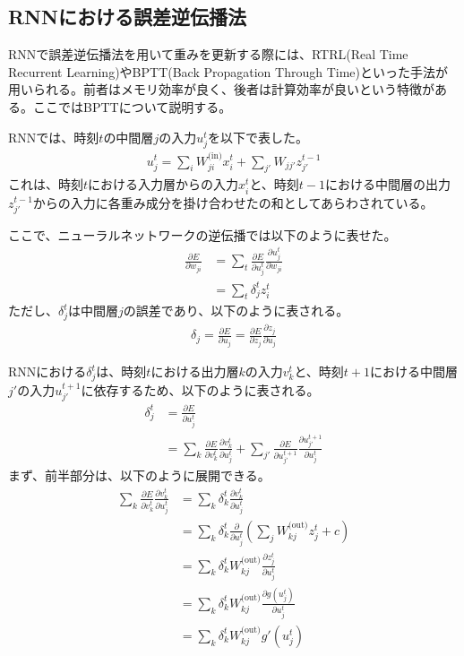 \documentclass{ltjsarticle}
\begin{document}
\subsection{RNNにおける誤差逆伝播法}
RNNで誤差逆伝播法を用いて重みを更新する際には、RTRL(Real Time Recurrent Learning)やBPTT(Back Propagation Through Time)といった手法が用いられる。前者はメモリ効率が良く、後者は計算効率が良いという特徴がある。ここではBPTTについて説明する。

RNNでは、時刻$t$の中間層$j$の入力$u_j^t$を以下で表した。
\begin{align}
  u_j^t = \sum_i W_{ji}^{\text{(in)}}x_i^t + \sum_{j'} W_{jj'}z_{j'}^{t-1}
\end{align}
これは、時刻$t$における入力層からの入力$x_i^t$と、時刻$t-1$における中間層の出力$z_{j'}^{t-1}$からの入力に各重み成分を掛け合わせたの和としてあらわされている。

ここで、ニューラルネットワークの逆伝播では以下のように表せた。
\begin{align}
  \frac{\partial E}{\partial w_{ji}} &= \sum_t \frac{\partial E}{\partial u_j^t} \frac{\partial u_j^t}{\partial w_{ji}}\\
  &= \sum_t \delta_j^t z_i^t
\end{align}
ただし、$\delta_j^t$は中間層$j$の誤差であり、以下のように表される。
\begin{align}
  \delta_j = \frac{\partial E}{\partial u_j} = \frac{\partial E}{\partial z_j} \frac{\partial z_j}{\partial u_j}
\end{align}

RNNにおける$\delta_j^t$は、時刻$t$における出力層$k$の入力$v_k^t$と、時刻$t+1$における中間層$j'$の入力$u_{j'}^{t+1}$に依存するため、以下のように表される。
\begin{align}
  \delta_j^t &= \frac{\partial E}{\partial u_j^t}\\
   &= \sum_k \frac{\partial E}{\partial v_k^t} \frac{\partial v_k^t}{\partial u_j^t} + \sum_{j'} \frac{\partial E}{\partial u_{j'}^{t+1}} \frac{\partial u_{j'}^{t+1}}{\partial u_j^t}
\end{align}
まず、前半部分は、以下のように展開できる。
\begin{align}
  \sum_k \frac{\partial E}{\partial v_k^t} \frac{\partial v_k^t}{\partial u_j^t} &= \sum_k \delta_k^t \frac{\partial v_k^t}{\partial u_j^t}\\
  &= \sum_k \delta_k^t \frac{\partial}{\partial u_j^t} \left( \sum_{j} W_{kj}^{\text{(out)}}z_{j}^t + c \right)\\
  &= \sum_k \delta_k^t W_{kj}^{\text{(out)}} \frac{\partial z_j^t}{\partial u_j^t}\\
  &= \sum_k \delta_k^t W_{kj}^{\text{(out)}} \frac{\partial g(u_j^t)}{\partial u_j^t}\\
  &= \sum_k \delta_k^t W_{kj}^{\text{(out)}} g'(u_j^t)
\end{align}
\end{document}
